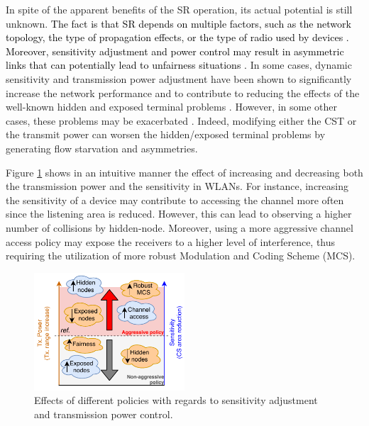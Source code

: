 \documentclass{article}
\begin{document}
In spite of the apparent benefits of the SR operation, its actual potential is still unknown. \textcolor{black}{The fact is that SR depends on multiple factors, such as the network topology, the type of propagation effects, or the type of radio used by devices \cite{guo2003spatial}. Moreover, sensitivity adjustment and power control may result in asymmetric links that can potentially lead to unfairness situations \cite{mhatre2007interference}.} In some cases, dynamic sensitivity and transmission power adjustment have been shown to significantly increase the network performance and to contribute to reducing the effects of the well-known hidden and exposed terminal problems \cite{zhou2005balancing}. However, in some other cases, these problems may be exacerbated \cite{wilhelmi2019potential}. Indeed, modifying either the CST or the transmit power can worsen the hidden/exposed terminal problems by generating flow starvation and asymmetries.

Figure \ref{fig:policies_sr} shows in an intuitive manner the effect of increasing and decreasing both the transmission power and the sensitivity in WLANs. For instance, increasing the sensitivity of a device may contribute to accessing the channel more often since the listening area is reduced. However, this can lead to observing a higher number of collisions by hidden-node. Moreover, using a more aggressive channel access policy may expose the receivers to a higher level of interference, thus requiring the utilization of more robust Modulation and Coding Scheme (MCS).
\begin{figure}[ht!]
	\centering
	\includegraphics[width=0.5\textwidth]{policies_sr}
	\caption{Effects of different policies with regards to sensitivity adjustment and transmission power control.}
	\label{fig:policies_sr}
\end{figure}
\end{document}
